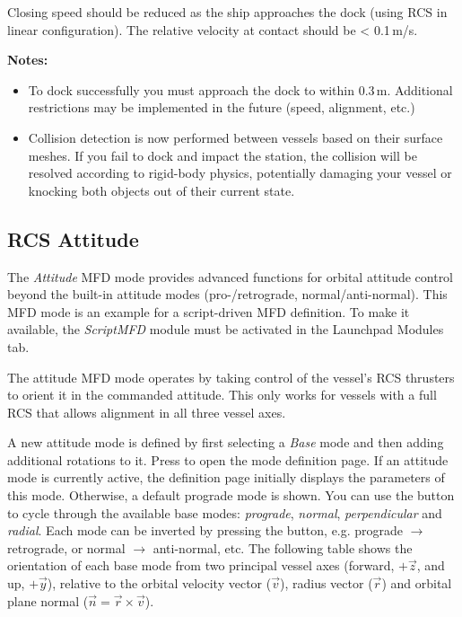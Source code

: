 \documentclass[Orbiter User Manual.tex]{subfiles}
\begin{document}
Closing speed should be reduced as the ship approaches the dock (using RCS in
linear configuration). The relative velocity at contact should be < 0.1\,m/s.

\textbf{Notes:}
\begin{itemize}
	\item To dock successfully you must approach the dock to within 0.3\,m.
		Additional restrictions may be implemented in the future (speed,
		alignment, etc.)
	\item Collision detection is now performed between vessels based on their
		surface meshes. If you fail to dock and impact the station, the
		collision will be resolved according to rigid-body physics, potentially
		damaging your vessel or knocking both objects out of their current state.
\end{itemize}


\subsection{RCS Attitude}
The \emph{Attitude} MFD mode provides advanced functions for orbital attitude
control beyond the built-in attitude modes (pro-/retrograde,
normal/anti-normal). This MFD mode is an example for a script-driven MFD
definition. To make it available, the \emph{ScriptMFD} module must be activated
in the Launchpad Modules tab.

The attitude MFD mode operates by taking control of the vessel's RCS thrusters
to orient it in the commanded attitude. This only works for vessels with a full
RCS that allows alignment in all three vessel axes.

A new attitude mode is defined by first selecting a \emph{Base} mode and then
adding additional rotations to it. Press  to open the mode
definition page. If an attitude mode is currently active, the definition page
initially displays the parameters of this mode. Otherwise, a default prograde
mode is shown. You can use the  button to cycle through the
available base modes: \emph{prograde}, \emph{normal}, \emph{perpendicular} and
\emph{radial}. Each mode can be inverted by pressing the  button,
e.g. prograde $\rightarrow$ retrograde, or normal $\rightarrow$ anti-normal,
etc. The following table shows the orientation of each base mode from two
principal vessel axes (forward, $+\vec{z}$, and up, $+\vec{y}$), relative to the
orbital velocity vector ($\vec{v}$), radius vector ($\vec{r}$) and orbital
plane normal ($\vec{n} = \vec{r} \times \vec{v}$).
\end{document}
